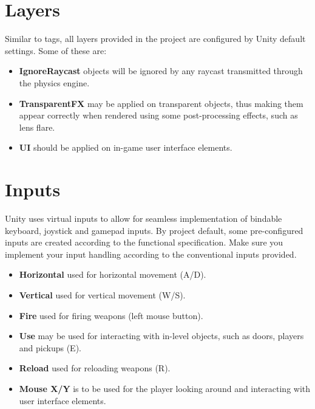 \documentclass{article}
\begin{document}
\section{Layers}
Similar to tags, all layers provided in the project are configured by Unity default settings. Some of these are:
\begin{itemize}
\item \textbf{IgnoreRaycast} objects will be ignored by any raycast transmitted through the physics engine.
\item \textbf{TransparentFX} may be applied on transparent objects, thus making them appear correctly when rendered using some post-processing effects, such as lens flare.
\item \textbf{UI} should be applied on in-game user interface elements.
\end{itemize}

\section{Inputs}
Unity uses virtual inputs to allow for seamless implementation of bindable keyboard, joystick and gamepad inputs.
By project default, some pre-configured inputs are created according to the functional specification. Make sure you implement your input handling according to the conventional inputs provided.
\begin{itemize}
\item \textbf{Horizontal} used for horizontal movement (A/D).
\item \textbf{Vertical} used for vertical movement (W/S).
\item \textbf{Fire} used for firing weapons (left mouse button).
\item \textbf{Use} may be used for interacting with in-level objects, such as doors, players and pickups (E).
\item \textbf{Reload} used for reloading weapons (R).
\item \textbf{Mouse X/Y} is to be used for the player looking around and interacting with user interface elements.
\end{itemize}
\end{document}
